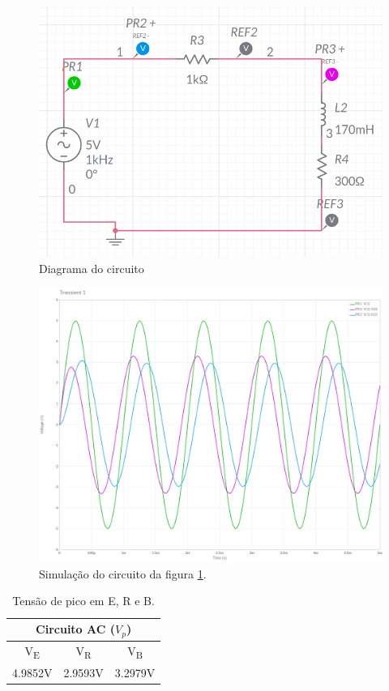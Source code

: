 \documentclass[11pt]{article}
\begin{document}

\begin{figure}[h!]
  \centering
  \includegraphics[width=.62\textwidth]{fig/1c}
  \caption{Diagrama do circuito}
  \label{fig:circ-1c}
\end{figure}

\pagebreak

\begin{figure}[h!]
  \centering
  \includegraphics[width=.8\textwidth]{fig/1c_graph}
  \caption{Simulação do circuito da figura \ref{fig:circ-1c}.}
\end{figure}

\begin{table}[h!]
  \centering
  \begin{tabular}{|c|c|c|}
    \hline
    \multicolumn{3}{|c|}{Circuito AC ($V_{p}$)}                  \\
    \hline
    V\textsubscript{E} & V\textsubscript{R} & V\textsubscript{B} \\
    \hline
    4.9852V            & 2.9593V            & 3.2979V            \\
    \hline
  \end{tabular}
  \caption{Tensão de pico em E, R e B.}
\end{table}
\end{document}
